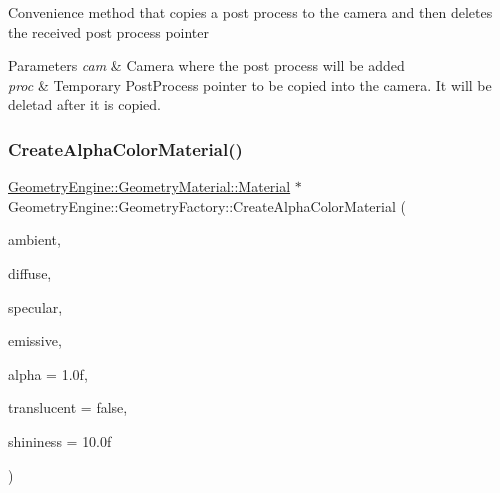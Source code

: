 Convenience method that copies a post process to the camera and then deletes the received post process pointer 
\begin{DoxyParams}{Parameters}
{\em cam} & Camera where the post process will be added \\
\hline
{\em proc} & Temporary Post\+Process pointer to be copied into the camera. It will be deletad after it is copied. \\
\hline
\end{DoxyParams}
\mbox{\label{class_geometry_engine_1_1_geometry_factory_a3d37605b9cc44fd0b3a058f961b76a35}} 
\subsubsection{\texorpdfstring{CreateAlphaColorMaterial()}{CreateAlphaColorMaterial()}}
{\footnotesize\ttfamily \mbox{\hyperlink{class_geometry_engine_1_1_geometry_material_1_1_material}{Geometry\+Engine\+::\+Geometry\+Material\+::\+Material}} $\ast$ Geometry\+Engine\+::\+Geometry\+Factory\+::\+Create\+Alpha\+Color\+Material (\begin{DoxyParamCaption}\item[{const Q\+Vector3D \&}]{ambient,  }\item[{const Q\+Vector3D \&}]{diffuse,  }\item[{const Q\+Vector3D \&}]{specular,  }\item[{const Q\+Vector3D \&}]{emissive,  }\item[{float}]{alpha = {\ttfamily 1.0f},  }\item[{bool}]{translucent = {\ttfamily false},  }\item[{float}]{shininess = {\ttfamily 10.0f} }\end{DoxyParamCaption})\hspace{0.3cm}{\ttfamily [static]}}

